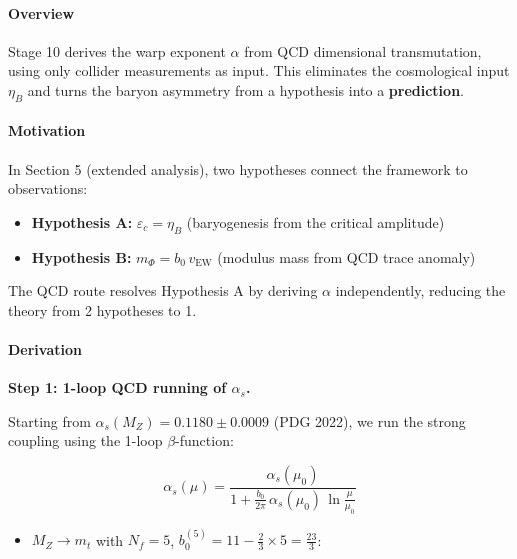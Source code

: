 \documentclass[
  11pt,
]{article}
\providecommand{\tightlist}{%
  \setlength{\itemsep}{0pt}\setlength{\parskip}{0pt}}
\begin{document}
\hypertarget{overview-9}{%
\paragraph{Overview}\label{overview-9}}

Stage 10 derives the warp exponent \(\alpha\) from QCD dimensional
transmutation, using only collider measurements as input. This
eliminates the cosmological input \(\eta_B\) and turns the baryon
asymmetry from a hypothesis into a \textbf{prediction}.

\bigskip

\hypertarget{motivation}{%
\paragraph{Motivation}\label{motivation}}

In Section 5 (extended analysis), two hypotheses connect the framework
to observations:

\begin{itemize}
\tightlist
\item
  \textbf{Hypothesis A:} \(\varepsilon_c = \eta_B\) (baryogenesis from
  the critical amplitude)
\item
  \textbf{Hypothesis B:} \(m_\Phi = b_0 \, v_\text{EW}\) (modulus mass
  from QCD trace anomaly)
\end{itemize}

The QCD route resolves Hypothesis A by deriving \(\alpha\)
independently, reducing the theory from 2 hypotheses to 1.

\bigskip

\hypertarget{derivation}{%
\paragraph{Derivation}\label{derivation}}

\textbf{Step 1: 1-loop QCD running of \(\alpha_s\).}

Starting from \(\alpha_s(M_Z) = 0.1180 \pm 0.0009\) (PDG 2022), we run
the strong coupling using the 1-loop \(\beta\)-function:

\[\alpha_s(\mu) = \frac{\alpha_s(\mu_0)}{1 + \frac{b_0}{2\pi}\,\alpha_s(\mu_0)\,\ln\frac{\mu}{\mu_0}} \tag{145}\]

\begin{itemize}
\tightlist
\item
  \(M_Z \to m_t\) with \(N_f = 5\),
  \(b_0^{(5)} = 11 - \tfrac{2}{3}\times 5 = \tfrac{23}{3}\):
\end{itemize}
\end{document}
